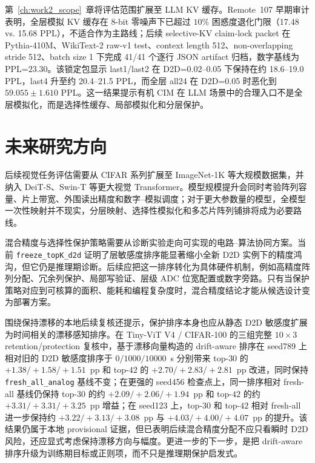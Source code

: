 第~\ref{ch:work2_scope}~章将评估范围扩展至 LLM KV 缓存。Remote~107 早期审计表明，全层模拟 KV 缓存在 8-bit 零噪声下已超过 $10\%$ 困惑度退化门限（17.48 vs. 15.68 PPL），不适合作为主路线；后续 selective-KV claim-lock packet 在 Pythia-410M、WikiText-2 raw-v1 test、context length 512、non-overlapping stride 512、batch size 1 下完成 41/41 个逐行 JSON artifact 归档，数字基线为 PPL=23.30。该锁定包显示 last1/last2 在 D2D=0.02--0.05 下保持在约 18.6--19.0 PPL，last4 升至约 20.4--21.5 PPL，而全层 all24 在 D2D=0.05 时恶化到 $59.055\pm1.610$ PPL。这一结果提示有机 CIM 在 LLM 场景中的合理入口不是全层模拟化，而是选择性缓存、局部模拟化和分层保护。

\FloatBarrier

\section{未来研究方向}

后续视觉任务评估需要从 CIFAR 系列扩展至 ImageNet-1K 等大规模数据集，并纳入 DeiT-S、Swin-T 等更大视觉 Transformer。模型规模提升会同时考验阵列容量、片上带宽、外围读出精度和数字--模拟调度；对于更大参数量的模型，全模型一次性映射并不现实，分层映射、选择性模拟化和多芯片阵列铺排将成为必要路线。

混合精度与选择性保护策略需要从诊断实验走向可实现的电路--算法协同方案。当前 \texttt{freeze\_topK\_d2d} 证明了层敏感度排序能显著缩小全新 D2D 实例下的精度鸿沟，但它仍是推理期诊断。后续应把这一排序转化为具体硬件机制，例如高精度阵列分配、冗余列保护、局部写验证、层级 ADC 位宽配置或数字旁路。只有当保护策略对应到可核算的面积、能耗和编程复杂度时，混合精度结论才能从候选设计变为部署方案。

围绕保持漂移的本地后续复核还提示，保护排序本身也应从静态 D2D 敏感度扩展为时间相关的漂移感知排序。在 Tiny-ViT V4 / CIFAR-100 的三组完整 $10\times3$ retention/protection 复核中，基于漂移向量构造的 drift-aware 排序在 seed789 上相对旧的 D2D 敏感度排序于 $0/1000/10000$~s 分别带来 top-$30$ 的 $+1.38/+1.58/+1.51$~pp 和 top-$42$ 的 $+2.70/+2.83/+2.81$~pp 改进，同时保持 \texttt{fresh\_all\_analog} 基线不变；在更强的 seed456 检查点上，同一排序相对 fresh-all 基线仍保持 top-$30$ 的约 $+2.09/+2.06/+1.94$~pp 和 top-$42$ 的约 $+3.31/+3.31/+3.25$~pp 增益；在 seed123 上，top-$30$ 和 top-$42$ 相对 fresh-all 进一步保持约 $+3.22/+3.13/+3.08$~pp 与 $+4.03/+4.00/+4.07$~pp 的提升。该结果仍属于本地 provisional 证据，但已表明后续混合精度分配不应只看瞬时 D2D 风险，还应显式考虑保持漂移方向与幅度。更进一步的下一步，是把 drift-aware 排序升级为训练期目标或正则项，而不只是推理期保护启发式。

